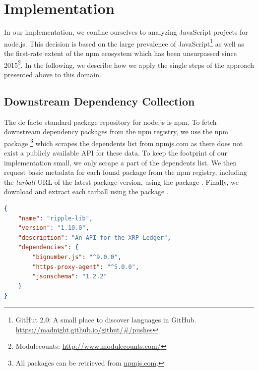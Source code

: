 \section{Implementation}
\label{sec:implementation}

In our implementation, we confine ourselves to analyzing JavaScript projects for node.js.
This decision is based on the large prevalence of JavaScript\footnote{GitHut 2.0: A small place to discover languages in GitHub. \url{https://madnight.github.io/githut/\#/pushes}} as well as the first-rate extent of the npm ecosystem which has been unsurpassed since 2015\footnote{Modulecounts: \url{http://www.modulecounts.com/}}.
In the following, we describe how we apply the single steps of the approach presented above to this domain.

\subsection{Downstream Dependency Collection}
\label{sec:implementation/dependency_collection}

The de facto standard package repository for node.js is npm.
To fetch downstream dependency packages from the npm registry, we use the npm package \footnote{All packages can be retrieved from \url{npmjs.com}.} which scrapes the dependents list from npmjs.com as there does not exist a publicly available API for these data.
To keep the footprint of our implementation small, we only scrape a part of the dependents list.
We then request basic metadata for each found package from the npm registry, including the \emph{tarball} URL of the latest package version, using the package .
Finally, we download and extract each tarball using the package .

\begin{lstlisting}[language=json,
	label=sec:implementation/package.json,
	caption={An example \code{package.json} file for the \code{ripple-lib} package specifying multiple dependencies (truncated).},
	float=tpb,
	floatplacement=tbp,
	abovecaptionskip=-5pt
]
{
	"name": "ripple-lib",
	"version": "1.10.0",
	"description": "An API for the XRP Ledger",
	"dependencies": {
		"bignumber.js": "^9.0.0",
		"https-proxy-agent": "^5.0.0",
		"jsonschema": "1.2.2"
	}
}
\end{lstlisting}

